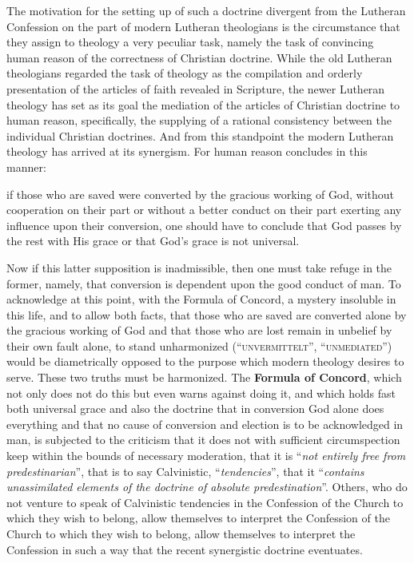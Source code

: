                 The motivation for the setting up of such a doctrine divergent from the Lutheran Confession on the part of modern Lutheran theologians is the circumstance that they assign to theology a very peculiar task, namely the task of convincing human reason of the correctness of Christian doctrine.  While the old Lutheran theologians regarded the task of theology as the compilation and orderly presentation of the articles of faith revealed in Scripture, the newer Lutheran theology has set as its goal the mediation of the articles of Christian doctrine to human reason, specifically, the supplying of a rational consistency between the individual Christian doctrines.  And from this standpoint the modern Lutheran theology has arrived at its synergism.  For human reason concludes in this manner:\begin{displayquote}{\footnotesize if those who are saved were converted by the gracious working of God, without cooperation on their part or without a better conduct on their part exerting any influence upon their conversion, one should have to conclude that God passes by the rest with His grace or that God’s grace is not universal.}\end{displayquote}  Now if this latter supposition is inadmissible, then one must take refuge in the former, namely, that conversion is dependent upon the good conduct of man.  To acknowledge at this point, with the Formula of Concord, a mystery insoluble in this life, and to allow both facts, that those who are saved are converted alone by the gracious working of God and that those who are lost remain in unbelief by their own fault alone, to stand unharmonized {\scriptsize\textsc{(“unvermittelt”, “unmediated”)}} would be diametrically opposed to the purpose which modern theology desires to serve.  These two truths must be harmonized.  The \textbf{Formula of Concord}, which not only does not do this but even warns against doing it, and which holds fast both universal grace and also the doctrine that in conversion God alone does everything and that no cause of conversion and election is to be acknowledged in man, is subjected to the criticism that it does not with sufficient circumspection keep within the bounds of necessary moderation, that it is “\textit{not entirely free from predestinarian}”, that is to say Calvinistic, “\textit{tendencies}”, that it “\textit{contains unassimilated elements of the doctrine of absolute predestination}”.  Others, who do not venture to speak of Calvinistic tendencies in the Confession of the Church to which they wish to belong, allow themselves to interpret the Confession of the Church to which they wish to belong, allow themselves to interpret the Confession in such a way that the recent synergistic doctrine eventuates.

